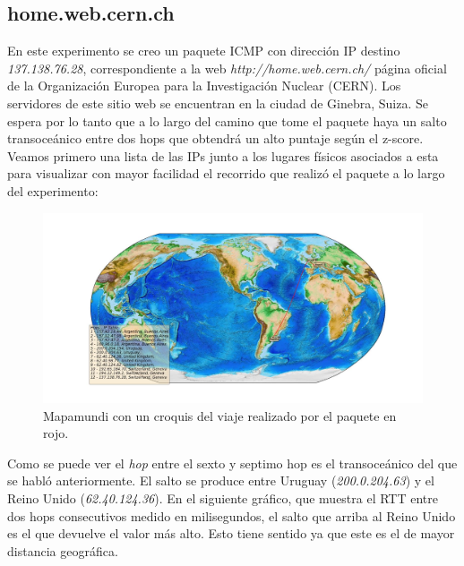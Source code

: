 \subsection{home.web.cern.ch}

En este experimento se creo un paquete ICMP con dirección IP destino \textit{137.138.76.28}, correspondiente a la web \textit{http://home.web.cern.ch/} página oficial de la Organización Europea para la Investigación Nuclear (CERN). Los servidores de este sitio web se encuentran en la ciudad de Ginebra, Suiza. Se espera por lo tanto que a lo largo del camino que tome el paquete haya un salto transoceánico entre dos hops que obtendrá un alto puntaje según el z-score. Veamos primero una lista de las IPs junto a los lugares físicos asociados a esta para visualizar con mayor facilidad el recorrido que realizó el paquete a lo largo del experimento:

\begin{figure}[H]
  \centering	
	\includegraphics[scale=0.3]{../cern-experiment/figure_1.jpeg}
  \caption{Mapamundi con un croquis del viaje realizado por el paquete en rojo.}
	\label{fig:histo-src-sitiotrabajo}
\end{figure}

Como se puede ver el \textit{hop} entre el sexto y septimo hop es el transoceánico del que se habló anteriormente. El salto se produce entre Uruguay (\textit{200.0.204.63}) y el Reino Unido (\textit{62.40.124.36}). En el siguiente gráfico, que muestra el RTT entre dos hops consecutivos medido en milisegundos, el salto que arriba al Reino Unido es el que devuelve el valor más alto. Esto tiene sentido ya que este es el de mayor distancia geográfica.

